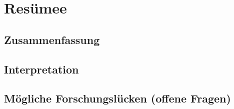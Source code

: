 
\chapter{Resümee}


\section{Zusammenfassung}


\section{Interpretation}


\section{Mögliche Forschungslücken (offene Fragen)}

